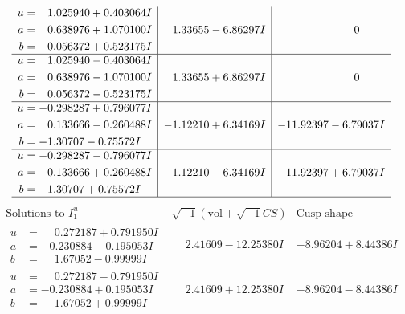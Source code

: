 \documentclass[1p]{elsarticle_modified}
\theoremstyle{definition}
\newcommand{\I}{\sqrt{-1}}
\begin{document}
$$\begin{array}{c|c|c}
\begin{aligned}
u &= \phantom{-}1.025940 + 0.403064 I \\
a &= \phantom{-}0.638976 + 1.070100 I \\
b &= \phantom{-}0.056372 + 0.523175 I\end{aligned}
 & \phantom{-}1.33655 - 6.86297 I & \phantom{-0.000000 } 0 \\ \hline\begin{aligned}
u &= \phantom{-}1.025940 - 0.403064 I \\
a &= \phantom{-}0.638976 - 1.070100 I \\
b &= \phantom{-}0.056372 - 0.523175 I\end{aligned}
 & \phantom{-}1.33655 + 6.86297 I & \phantom{-0.000000 } 0 \\ \hline\begin{aligned}
u &= -0.298287 + 0.796077 I \\
a &= \phantom{-}0.133666 - 0.260488 I \\
b &= -1.30707 - 0.75572 I\end{aligned}
 & -1.12210 + 6.34169 I & -11.92397 - 6.79037 I \\ \hline\begin{aligned}
u &= -0.298287 - 0.796077 I \\
a &= \phantom{-}0.133666 + 0.260488 I \\
b &= -1.30707 + 0.75572 I\end{aligned}
 & -1.12210 - 6.34169 I & -11.92397 + 6.79037 I\\
 \hline 
 \end{array}$$\newpage$$\begin{array}{c|c|c}  
\text{Solutions to }I^u_{1}& \I (\text{vol} + \sqrt{-1}CS) & \text{Cusp shape}\\
 \hline 
\begin{aligned}
u &= \phantom{-}0.272187 + 0.791950 I \\
a &= -0.230884 - 0.195053 I \\
b &= \phantom{-}1.67052 - 0.99999 I\end{aligned}
 & \phantom{-}2.41609 - 12.25380 I & -8.96204 + 8.44386 I \\ \hline\begin{aligned}
u &= \phantom{-}0.272187 - 0.791950 I \\
a &= -0.230884 + 0.195053 I \\
b &= \phantom{-}1.67052 + 0.99999 I\end{aligned}
 & \phantom{-}2.41609 + 12.25380 I & -8.96204 - 8.44386 I \\ \hline\begin{aligned}

\end{aligned}
\end{array}$$
\end{document}
